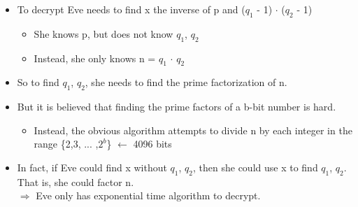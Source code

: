 \documentclass[12pt]{article}
\begin{document}
\begin{itemize}
	\begin{itemize}
	\item To decrypt Eve needs to find x the inverse of p and ($q_{1}$ - 1) $\cdot$ ($q_{2}$ 			- 1)
		\begin{itemize}
		\item She knows p, but does not know $q_1$, $q_2$
		\item Instead, she only knows n = $q_1$ $\cdot$ $q_2$
		\end{itemize}
	\item So to find $q_1$, $q_2$, she needs to find the prime factorization of n.
	\item But it is believed that finding the prime factors of a b-bit number is hard.
		\begin{itemize}
		\item Instead, the obvious algorithm attempts to divide n by each integer in the range 			\{2,3, ... ,$2^b$\} $\leftarrow$ 4096 bits
		\end{itemize}
	\item In fact, if 	Eve could find x without $q_1$, $q_2$, then she could use x to find $q_1$, 		$q_2$. That is, she could factor n.\\
	\noindent $\Rightarrow$ Eve only has exponential time algorithm to decrypt.
	\end{itemize}
\end{itemize}
\end{document}
